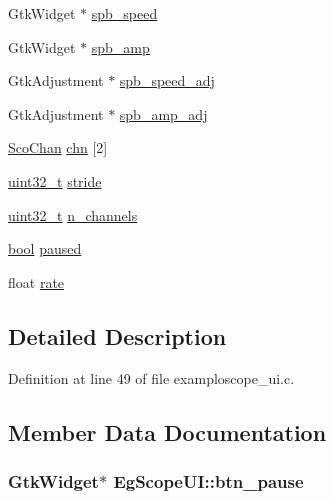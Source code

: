 \begin{DoxyCompactItemize}
Gtk\+Widget $\ast$ \hyperlink{struct_eg_scope_u_i_a0a9ef573042733a3b7ec034d2e72d87a}{spb\+\_\+speed}
\item 
Gtk\+Widget $\ast$ \hyperlink{struct_eg_scope_u_i_a6c00d323085900bb188f4b8d51b4b5a3}{spb\+\_\+amp}
\item 
Gtk\+Adjustment $\ast$ \hyperlink{struct_eg_scope_u_i_ae358150017bf8958eceeff4f31c45587}{spb\+\_\+speed\+\_\+adj}
\item 
Gtk\+Adjustment $\ast$ \hyperlink{struct_eg_scope_u_i_a404a1b0550c194bdb5c4ba54a2dd6ef8}{spb\+\_\+amp\+\_\+adj}
\item 
\hyperlink{struct_sco_chan}{Sco\+Chan} \hyperlink{struct_eg_scope_u_i_a204177cc9c742bcb4b3d72959eddb792}{chn} \mbox{[}2\mbox{]}
\item 
\hyperlink{lib-src_2ffmpeg_2win32_2stdint_8h_a6eb1e68cc391dd753bc8ce896dbb8315}{uint32\+\_\+t} \hyperlink{struct_eg_scope_u_i_a9cc245db681926f7cb67f28d5f92d8b8}{stride}
\item 
\hyperlink{lib-src_2ffmpeg_2win32_2stdint_8h_a6eb1e68cc391dd753bc8ce896dbb8315}{uint32\+\_\+t} \hyperlink{struct_eg_scope_u_i_a85e0b481e8221476d499520df18ef3fb}{n\+\_\+channels}
\item 
\hyperlink{mac_2config_2i386_2lib-src_2libsoxr_2soxr-config_8h_abb452686968e48b67397da5f97445f5b}{bool} \hyperlink{struct_eg_scope_u_i_a4beda886d8ce3c72037fcfae5d6d13fc}{paused}
\item 
float \hyperlink{struct_eg_scope_u_i_a0420ce71a5020b536cfb74e375f4d57c}{rate}
\end{DoxyCompactItemize}


\subsection{Detailed Description}


Definition at line 49 of file examploscope\+\_\+ui.\+c.



\subsection{Member Data Documentation}
\subsubsection[{\texorpdfstring{btn\+\_\+pause}{btn_pause}}]{\setlength{\rightskip}{0pt plus 5cm}Gtk\+Widget$\ast$ Eg\+Scope\+U\+I\+::btn\+\_\+pause}\hypertarget{struct_eg_scope_u_i_afdda0e3c91851370d2b294730196037f}{}\label{struct_eg_scope_u_i_afdda0e3c91851370d2b294730196037f}


